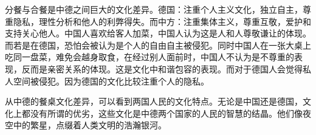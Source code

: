 \par
分餐与合餐是中德之间巨大的文化差异。德国：注重个人主义文化，独立自主，尊重隐私，理性分析和他人的利弊得失。而中方：注重集体主义，尊重互敬，爱护和支持关心他人。中国人喜欢给客人加菜，中国人认为这是人和人尊敬谦让的体现。而若是在德国，恐怕会被认为是个人的自由自主被侵犯。同时中国人在一张大桌上吃同一盘菜，难免会越身取食，在经过别人面前时，中国人不认为是不尊重的表现，反而是亲密关系的体现。这是文化中和谐包容的表现。而对于德国人会觉得私人空间被侵犯。因为德国的文化比较注重个人的隐私。
\par
从中德的餐桌文化差异，可以看到两国人民的文化特点。无论是中国还是德国，文化上都没有所谓的优劣，这些文化是中德两个国家的人民的智慧的结晶。他们像夜空中的繁星，点缀着人类文明的浩瀚银河。

